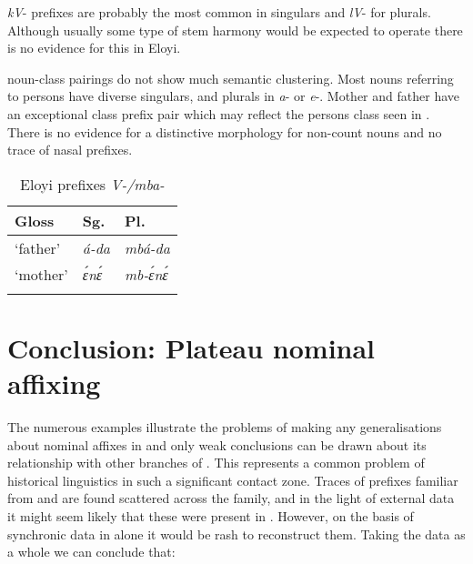 \documentclass[output=paper]{langsci/langscibook}
\begin{document}
\textit{kV}- prefixes are probably the most common in  singulars and \textit{lV}- for plurals. Although usually some type of stem harmony would be expected to operate there is no evidence for this in Eloyi. 


 noun-class pairings do not show much semantic clustering. Most nouns referring to persons have diverse singulars, and plurals in \textit{a}- or \textit{e}-. Mother and father have an exceptional class prefix pair which may reflect the  persons class seen in . There is no evidence for a distinctive morphology for non-count nouns and no trace of nasal prefixes.

\begin{table}
\caption{Eloyi prefixes \textit{V-/mba-}}
\label{extab:nomaffplat:63}
\begin{tabularx}{\textwidth}{XXl}
\lsptoprule 
Gloss 	& Sg.  	& Pl. \\
\midrule
‘father’ 	& \itshape á-da 	& \itshape mbá-da\\
‘mother’ 	& \itshape ɛ́nɛ́ 	& \itshape mb-ɛ́nɛ́\\
\lspbottomrule
\end{tabularx}
\end{table}
 
\section{Conclusion: Plateau nominal affixing} %

The numerous examples illustrate the problems of making any generalisations about nominal affixes in  and only weak conclusions can be drawn about its relationship with other branches of . This represents a common problem of historical linguistics in such a significant contact zone. Traces of prefixes familiar from  and  are found scattered across the family, and in the light of external data it might seem likely that these were present in . However, on the basis of synchronic data in  alone it would be rash to reconstruct them. Taking the data as a whole we can conclude that: 
\end{document}
